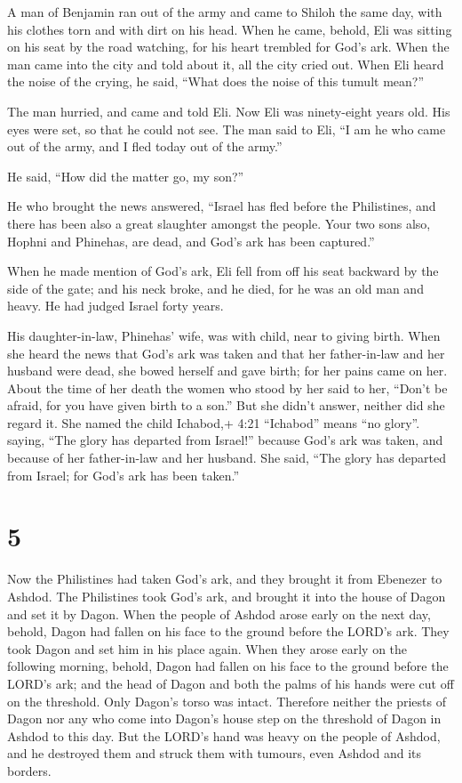  A man of Benjamin ran out of the army and came to Shiloh
the same day, with his clothes torn and with dirt on his head.
 When he came, behold, Eli was sitting on his seat by the
road watching, for his heart trembled for God's ark. When the man came
into the city and told about it, all the city cried out. 
When Eli heard the noise of the crying, he said, ``What does the noise
of this tumult mean?''

The man hurried, and came and told Eli.  Now Eli was
ninety-eight years old. His eyes were set, so that he could not see.
 The man said to Eli, ``I am he who came out of the army,
and I fled today out of the army.''

He said, ``How did the matter go, my son?''

 He who brought the news answered, ``Israel has fled before
the Philistines, and there has been also a great slaughter amongst the
people. Your two sons also, Hophni and Phinehas, are dead, and God's ark
has been captured.''

 When he made mention of God's ark, Eli fell from off his
seat backward by the side of the gate; and his neck broke, and he died,
for he was an old man and heavy. He had judged Israel forty years.

 His daughter-in-law, Phinehas' wife, was with child, near
to giving birth. When she heard the news that God's ark was taken and
that her father-in-law and her husband were dead, she bowed herself and
gave birth; for her pains came on her.  About the time of
her death the women who stood by her said to her, ``Don't be afraid, for
you have given birth to a son.'' But she didn't answer, neither did she
regard it.  She named the child Ichabod,+ 4:21 ``Ichabod''
means ``no glory''. saying, ``The glory has departed from Israel!''
because God's ark was taken, and because of her father-in-law and her
husband.  She said, ``The glory has departed from Israel;
for God's ark has been taken.''

\hypertarget{section-4}{%
\section{5}\label{section-4}}

 Now the Philistines had taken God's ark, and they brought
it from Ebenezer to Ashdod.  The Philistines took God's ark,
and brought it into the house of Dagon and set it by Dagon. 
When the people of Ashdod arose early on the next day, behold, Dagon had
fallen on his face to the ground before the LORD's ark. They took Dagon
and set him in his place again.  When they arose early on
the following morning, behold, Dagon had fallen on his face to the
ground before the LORD's ark; and the head of Dagon and both the palms
of his hands were cut off on the threshold. Only Dagon's torso was
intact.  Therefore neither the priests of Dagon nor any who
come into Dagon's house step on the threshold of Dagon in Ashdod to this
day.  But the LORD's hand was heavy on the people of Ashdod,
and he destroyed them and struck them with tumours, even Ashdod and its
borders.

